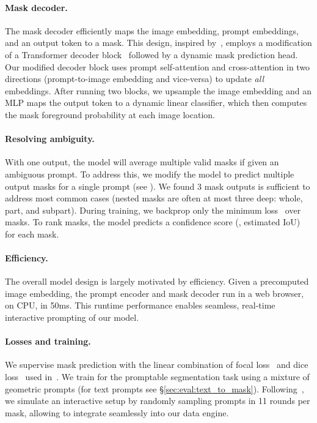 \paragraph{Mask decoder.} The mask decoder efficiently maps the image embedding, prompt embeddings, and an output token to a mask. This design, inspired by~\cite{Carion2020,cheng2021per}, employs a modification of a Transformer decoder block~\cite{Vaswani2017} followed by a dynamic mask prediction head. Our modified decoder block uses prompt self-attention and cross-attention in two directions (prompt-to-image embedding and vice-versa) to update \emph{all} embeddings. After running two blocks, we upsample the image embedding and an MLP maps the output token to a dynamic linear classifier, which then computes the mask foreground probability at each image location.

\paragraph{Resolving ambiguity.} With one output, the model will average multiple valid masks if given an ambiguous prompt. To address this, we modify the model to predict multiple output masks for a single prompt (see ). We found 3 mask outputs is sufficient to address most common cases (nested masks are often at most three deep: whole, part, and subpart). During training, we backprop only the minimum loss~\cite{charpiat2008automatic,guzman2012multiple,li2018interactive} over masks. To rank masks, the model predicts a confidence score (\ie, estimated IoU) for each mask.

\paragraph{Efficiency.} The overall model design is largely motivated by efficiency. Given a precomputed image embedding, the prompt encoder and mask decoder run in a web browser, on CPU, in \app50ms. This runtime performance enables seamless, real-time interactive prompting of our model.

\paragraph{Losses and training.} We supervise mask prediction with the linear combination of focal loss~\cite{Lin2017a} and dice loss~\cite{milletari2016v} used in~\cite{Carion2020}. We train for the promptable segmentation task using a mixture of geometric prompts (for text prompts see \S\ref{sec:eval:text_to_mask}). Following~\cite{sofiiuk2022reviving,forte2020getting}, we simulate an interactive setup by randomly sampling prompts in 11 rounds per mask, allowing \sam to integrate seamlessly into our data engine.

